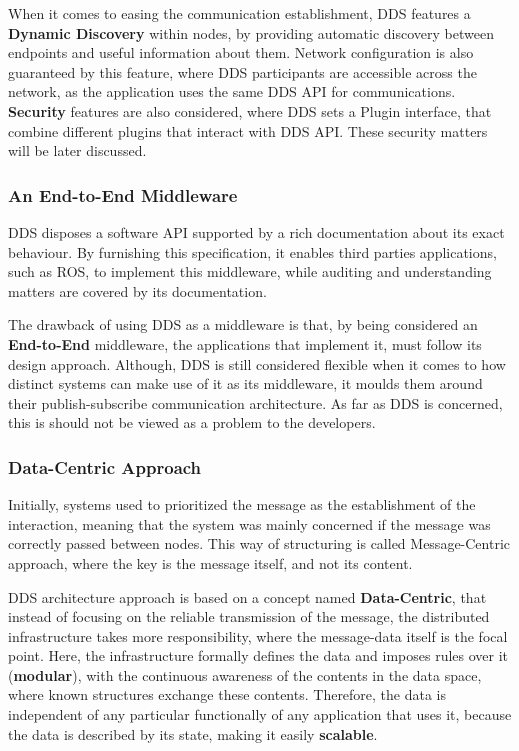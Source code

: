 When it comes to easing the communication establishment, DDS features a \textbf{Dynamic Discovery} within nodes, by providing automatic discovery between endpoints and useful information about them. Network configuration is also guaranteed by this feature, where DDS participants are accessible across the network, as the application uses the same DDS API for communications. \textbf{Security} features are also considered, where DDS sets a Plugin interface, that combine different plugins that interact with DDS API. These security matters will be later discussed.

\subsubsection{An End-to-End Middleware}

DDS disposes a software API supported by a rich documentation about its exact behaviour. By furnishing this specification, it enables third parties applications, such as ROS, to implement this middleware, while auditing and understanding matters are covered by its documentation.

The drawback of using DDS as a middleware is that, by being considered an \textbf{End-to-End} middleware, the applications that implement it, must follow its design approach. Although, DDS is still considered flexible when it comes to how distinct systems can make use of it as its middleware, it moulds them around their publish-subscribe communication architecture. As far as DDS is concerned, this is should not be viewed as a problem to the developers.

\subsubsection{Data-Centric Approach}

Initially, systems used to prioritized the message as the establishment of the interaction, meaning that the system was mainly concerned if the message was correctly passed between nodes. This way of structuring is called Message-Centric approach, where the key is the message itself, and not its content.
            
DDS architecture approach is based on a concept named \textbf{Data-Centric}, that instead of focusing on the reliable transmission of the message, the distributed infrastructure takes more responsibility, where the message-data itself is the focal point. Here, the infrastructure formally defines the data and imposes rules over it (\textbf{modular}), with the continuous awareness of the contents in the data space, where known structures exchange these contents. Therefore, the data is independent of any particular functionally of any application that uses it, because the data is described by its state, making it easily \textbf{scalable}.
    
